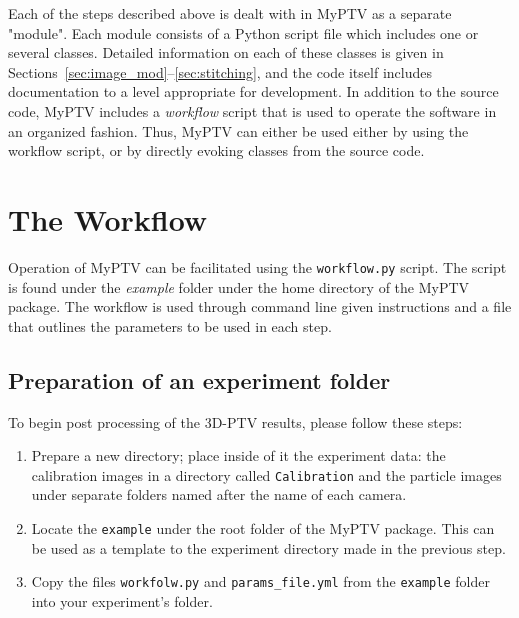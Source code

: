 \documentclass[10pt,a4paper]{article}
\begin{document}
Each of the steps described above is dealt with in MyPTV as a separate "module". Each module consists of a Python script file which includes one or several classes. Detailed information on each of these classes is given in Sections~\ref{sec:image_mod}--\ref{sec:stitching}, and the code itself includes documentation to a level appropriate for development. In addition to the source code, MyPTV includes a \textit{workflow} script that is used to operate the software in an organized fashion. Thus, MyPTV can either be used either by using the workflow script, or by directly evoking classes from the source code. 







\clearpage



\section{The Workflow}\label{sec:workflow}


Operation of MyPTV can be facilitated using the \texttt{workflow.py} script. The script is found under the \textit{example} folder under the home directory of the MyPTV package. The workflow is used through command line given instructions and a file that outlines the parameters to be used in each step.





\subsection{Preparation of an experiment folder}

To begin post processing of the 3D-PTV results, please follow these steps:

\begin{enumerate}
	\item Prepare a new directory; place inside of it the experiment data: the calibration images in a directory called \texttt{Calibration} and the particle images under separate folders named after the name of each camera.
	\item Locate the \texttt{example} under the root folder of the MyPTV package. This can be used as a template to the experiment directory made in the previous step.
	\item Copy the files \texttt{workfolw.py} and \texttt{params\_file.yml} from the \texttt{example} folder into your experiment's folder.
\end{enumerate}
\end{document}
